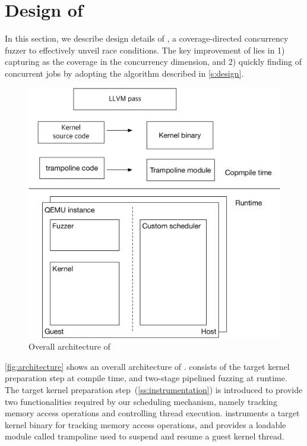 \section{Design of \sys}
\label{s:impl}

In this section, we describe design details of \sys, a
coverage-directed concurrency fuzzer to effectively unveil race
conditions.
%
The key improvement of \sys lies in 1) capturing \segments as the
coverage in the concurrency dimension, and 2) quickly finding
\segments of concurrent jobs by adopting the algorithm described in
\autoref{s:design}.
%

\begin{figure}
  \includegraphics[width=0.9\linewidth]{fig/architecture.pdf}
  \caption{Overall architecture of \sys}
  \label{fig:architecture}
\end{figure}
%
\autoref{fig:architecture} shows an overall architecture of \sys.
%
\sys consists of the target kernel preparation step at compile time,
and two-stage pipelined fuzzing at runtime.
%
The target kernel preparation step~(\autoref{ss:instrumentation}) is
introduced to provide two functionalities required by our scheduling
mechanism, namely tracking memory access operations and controlling
thread execution.
%
\sys instruments a target kernel binary for tracking memory access
operations, and provides a loadable module called trampoline used to
suspend and resume a guest kernel thread.


